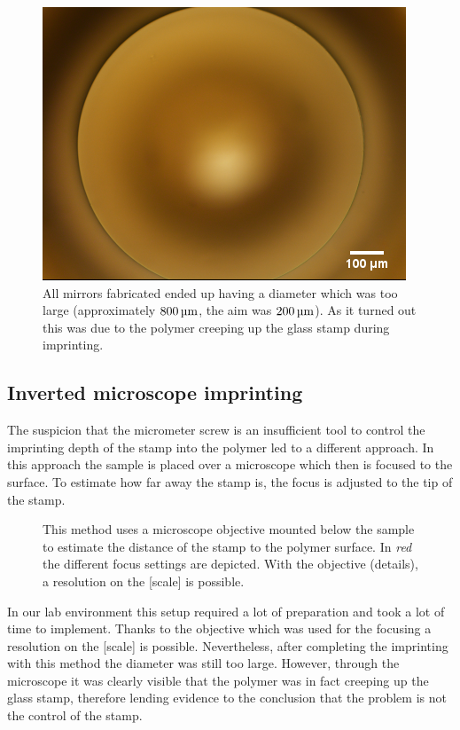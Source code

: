 \begin{figure}[H]
	\includegraphics[scale=0.6]{source/mirror_too_large}
	\caption{All mirrors fabricated ended up having a diameter which was too large (approximately $800\um$, the aim was $200\um$). As it turned out this was due to the polymer creeping up the glass stamp during imprinting.}
\end{figure}

\subsection{Inverted microscope imprinting}
The suspicion that the micrometer screw is an insufficient tool to control the imprinting depth of the stamp into the polymer led to a different approach. In this approach the sample is placed over a microscope which then is focused to the surface. To estimate how far away the stamp is, the focus is adjusted to the tip of the stamp.

\begin{figure}[H]
	
	\caption{This method uses a microscope objective mounted below the sample to estimate the distance of the stamp to the polymer surface. In \textit{red} the different focus settings are depicted. With the objective (details), a resolution on the [scale] is possible.}
\end{figure}
In our lab environment this setup required a lot of preparation and took a lot of time to implement. Thanks to the objective which was used for the focusing a resolution on the [scale] is possible. Nevertheless, after completing the imprinting with this method the diameter was still too large. However, through the microscope it was clearly visible that the polymer was in fact creeping up the glass stamp, therefore lending evidence to the conclusion that the problem is not the control of the stamp.

